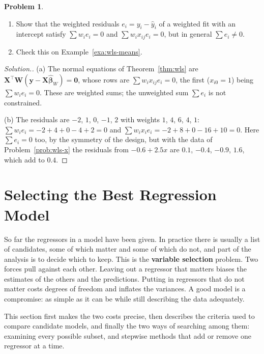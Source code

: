 \documentclass[11pt,a4paper]{article}
\numberwithin{equation}{section}
\theoremstyle{definition}
\newtheorem{problemx}{Problem}[subsection]
\newenvironment{problem}{\begin{problemx}}{\end{problemx}}
\newenvironment{solution}
  {\renewcommand{\qedsymbol}{}\begin{proof}[\textit{Solution}.]}
  {\end{proof}}
\begin{document}
\begin{problem}\label{prob:wls-resid}
\begin{enumerate}[label=(\alph*)]
\item Show that the weighted residuals $e_i = y_i - \hat y_i$ of a weighted fit with an intercept
satisfy $\sum w_i e_i = 0$ and $\sum w_i x_{ij}e_i = 0$, but in general $\sum e_i \neq 0$.
\item Check this on Example~\ref{exa:wls-means}.
\end{enumerate}
\end{problem}

\begin{solution}
(a) The normal equations of Theorem~\ref{thm:wls} are $\mathbf{X}^\top\mathbf{W}(\mathbf{y} - \mathbf{X}\hat{\boldsymbol\beta}_W) = \mathbf{0}$,
whose rows are $\sum w_i x_{ij}e_i = 0$, the first ($x_{i0} = 1$) being $\sum w_i e_i = 0$. These are
weighted sums; the unweighted sum $\sum e_i$ is not constrained.

(b) The residuals are $-2$, $1$, $0$, $-1$, $2$ with weights $1$, $4$, $6$, $4$, $1$:
$\sum w_ie_i = -2 + 4 + 0 - 4 + 2 = 0$ and $\sum w_ix_ie_i = -2 + 8 + 0 - 16 + 10 = 0$. Here
$\sum e_i = 0$ too, by the symmetry of the design, but with the data of Problem~\ref{prob:wls-x} the
residuals from $-0.6 + 2.5x$ are $0.1$, $-0.4$, $-0.9$, $1.6$, which add to $0.4$.
\end{solution}

\section{Selecting the Best Regression Model}
So far the regressors in a model have been given. In practice there is usually a list of
candidates, some of which matter and some of which do not, and part of the analysis is to decide
which to keep. This is the \textbf{variable selection} problem. Two forces pull against each
other. Leaving out a regressor that matters biases the estimates of the others and the
predictions. Putting in regressors that do not matter costs degrees of freedom and inflates the
variances. A good model is a compromise: as simple as it can be while still describing the data
adequately.

This section first makes the two costs precise, then describes the criteria used to compare
candidate models, and finally the two ways of searching among them: examining every possible
subset, and stepwise methods that add or remove one regressor at a time.
\end{document}
